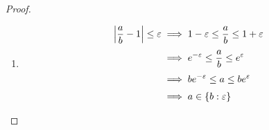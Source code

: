 \begin{proof}
\begin{enumerate}
    \item

      \begin{align}
        \abs{\frac ab - 1} \le \epsilon & \implies 1-\epsilon \le \frac ab \le 1+\epsilon \nl
        & \implies e^{-\epsilon} \le \frac ab \le e^{\epsilon} \nl
        & \implies be^{-\epsilon} \le a \le be^\epsilon \nl
        & \implies a \in \ean[\epsilon]{b}
      \end{align}
  \end{enumerate}

\end{proof}
